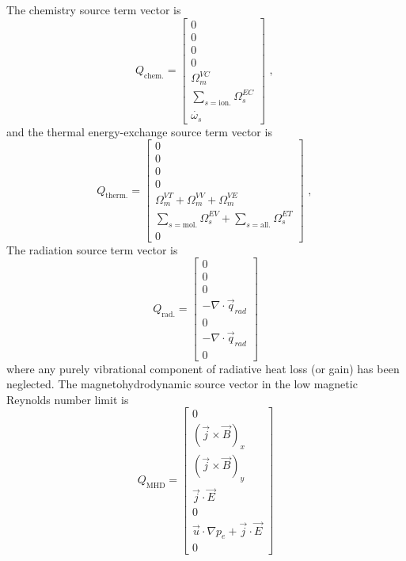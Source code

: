 \medskip
The chemistry source term vector is
\begin{equation}
 Q_{\text{chem.}} = \left [ \begin{array}{c} 0 \\ 0 \\ 0 \\ 0 \\ \Omega^{VC}_{m} \\ \sum_{s=\text{ion.}} \Omega^{EC}_{s} \\ \dot{\omega_{s}} \end{array} \right ] \text{ , }
 \label{eq:Q_chem}
\end{equation}
and the thermal energy-exchange source term vector is
\begin{equation}
 Q_{\text{therm.}} = \left [ \begin{array}{c} 0 \\ 0 \\ 0 \\ 0 \\ \Omega^{VT}_{m} + \Omega^{VV}_{m} + \Omega^{VE}_{m} \\ \sum_{s=\text{mol.}}\Omega^{EV}_{s} +  \sum_{s=\text{all.}}\Omega^{ET}_{s} \\ 0 \end{array} \right ] \text{ , }
 \label{eq:Q_therm}
\end{equation}
The radiation source term vector is
\begin{equation}
 Q_{\text{rad.}} = \left [ \begin{array}{c} 0 \\ 0 \\ 0 \\ -\nabla \cdot \vec{q}_{rad} \\ 0 \\ -\nabla \cdot \vec{q}_{rad} \\ 0 \end{array} \right ]
 \label{eq:Q_rad}
\end{equation}
where any purely vibrational component of radiative heat loss (or gain) has been neglected.
The magnetohydrodynamic source vector in the low magnetic Reynolds number limit is
\begin{equation}
 Q_{\text{MHD}} = \left [ \begin{array}{c} 0 \\ \left ( \vec{j} \times \vec{B} \right )_x \\ \left ( \vec{j} \times \vec{B} \right )_y \\ \vec{j} \cdot \vec{E} \\ 0 \\ \vec{u} \cdot \nabla p_e + \vec{j} \cdot \vec{E} \\ 0 \end{array} \right ]
 \label{eq:Q_rad}
\end{equation}
